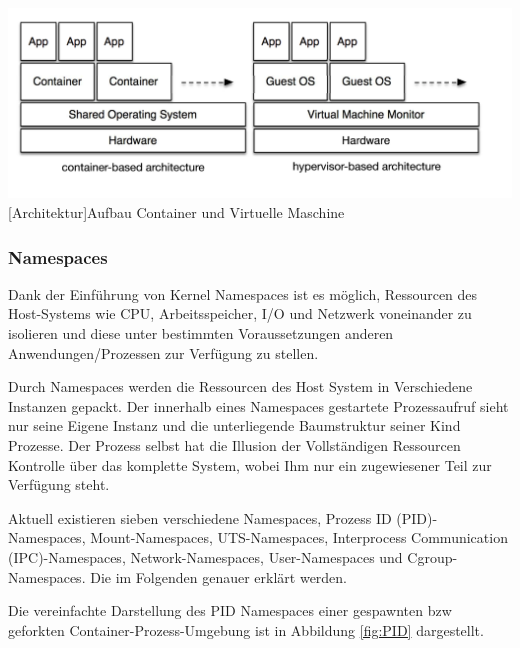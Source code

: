 \vspace{1em}
\begin{minipage}{\linewidth}
	\centering
	\includegraphics[width=1\linewidth]{pics/docker2.png}
	[Architektur]{Aufbau Container und Virtuelle Maschine \cite{Xavier2015AClouds}}
	\label{fig:architecture}
\end{minipage}

\subsubsection{Namespaces}
Dank der Einführung von Kernel Namespaces ist es möglich, Ressourcen des Host-Systems wie CPU, Arbeitsspeicher, I/O und Netzwerk voneinander zu isolieren und diese unter bestimmten Voraussetzungen anderen Anwendungen/Prozessen zur Verfügung zu stellen. 

Durch Namespaces werden die Ressourcen des Host System in Verschiedene Instanzen gepackt. Der innerhalb eines Namespaces gestartete Prozessaufruf sieht nur seine Eigene Instanz und die unterliegende Baumstruktur seiner Kind Prozesse. Der Prozess selbst hat die Illusion der Vollständigen Ressourcen Kontrolle über das komplette System, wobei Ihm nur ein zugewiesener Teil zur Verfügung steht.

Aktuell existieren sieben verschiedene Namespaces, Prozess ID (PID)-Namespaces, Mount-Namespaces, UTS-Namespaces, Interprocess Communication (IPC)-Namespaces, Network-Namespaces, User-Namespaces und Cgroup-Namespaces. Die im Folgenden genauer erklärt werden.

Die vereinfachte Darstellung des PID Namespaces einer gespawnten bzw geforkten Container-Prozess-Umgebung ist in Abbildung \ref{fig:PID} dargestellt. \cite{Liebel2017SkalierbareContainer-Infrastrukturen}

